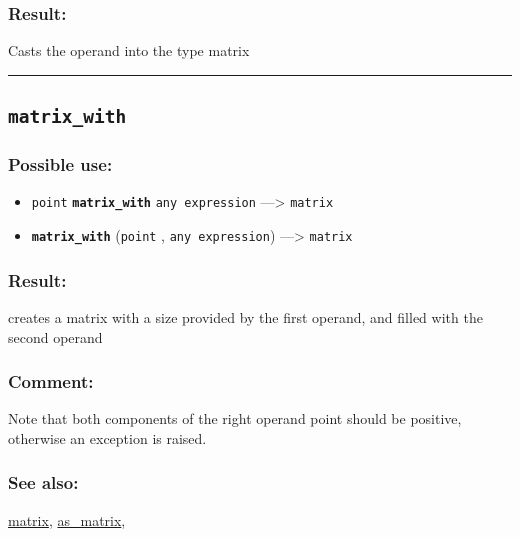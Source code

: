 \documentclass[]{book}
\providecommand{\tightlist}{%
  \setlength{\itemsep}{0pt}\setlength{\parskip}{0pt}}
\theoremstyle{definition}
\theoremstyle{definition}
\theoremstyle{definition}
\theoremstyle{remark}
\begin{document}
\subsubsection{Result:}\label{result-326}

Casts the operand into the type matrix

\begin{center}\rule{0.5\linewidth}{\linethickness}\end{center}

\subsection{\texorpdfstring{\texttt{matrix\_with}}{matrix\_with}}\label{matrix_with}

\subsubsection{Possible use:}\label{possible-use-338}

\begin{itemize}
\tightlist
\item
  \texttt{point} \textbf{\texttt{matrix\_with}} \texttt{any\ expression}
  ---\textgreater{} \texttt{matrix}
\item
  \textbf{\texttt{matrix\_with}} (\texttt{point} ,
  \texttt{any\ expression}) ---\textgreater{} \texttt{matrix}
\end{itemize}

\subsubsection{Result:}\label{result-327}

creates a matrix with a size provided by the first operand, and filled
with the second operand

\subsubsection{Comment:}\label{comment-64}

Note that both components of the right operand point should be positive,
otherwise an exception is raised.

\subsubsection{See also:}\label{see-also-133}

\href{OperatorsIM\#matrix}{matrix},
\href{OperatorsAA\#as_matrix}{as\_matrix},
\end{document}
